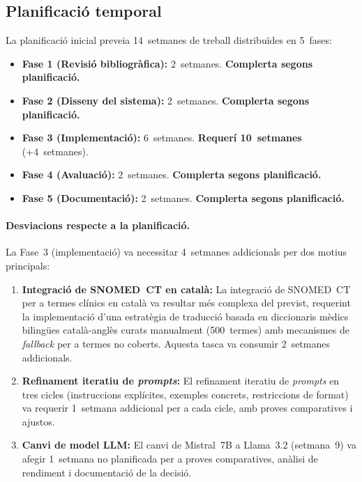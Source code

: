 \documentclass[CAT]{TFUOC}%
\begin{document}
\subsection{Planificació temporal}

La planificació inicial preveia 14~setmanes de treball distribuïdes en 5~fases:

\begin{itemize}
    \item \textbf{Fase 1 (Revisió bibliogràfica):} 2~setmanes. \textbf{Complerta segons planificació.}
    \item \textbf{Fase 2 (Disseny del sistema):} 2~setmanes. \textbf{Complerta segons planificació.}
    \item \textbf{Fase 3 (Implementació):} 6~setmanes. \textbf{Requerí 10~setmanes} (+4~setmanes).
    \item \textbf{Fase 4 (Avaluació):} 2~setmanes. \textbf{Complerta segons planificació.}
    \item \textbf{Fase 5 (Documentació):} 2~setmanes. \textbf{Complerta segons planificació.}
\end{itemize}

\paragraph{Desviacions respecte a la planificació.}
La Fase~3 (implementació) va necessitar 4~setmanes addicionals per dos motius principals:

\begin{enumerate}
    \item \textbf{Integració de SNOMED~CT en català:} La integració de SNOMED~CT per a termes clínics en català va resultar més complexa del previst, requerint la implementació d'una estratègia de traducció basada en diccionaris mèdics bilingües català-anglès curats manualment (500~termes) amb mecanismes de \textit{fallback} per a termes no coberts. Aquesta tasca va consumir 2~setmanes addicionals.
    
    \item \textbf{Refinament iteratiu de \textit{prompts}:} El refinament iteratiu de \textit{prompts} en tres cicles (instruccions explícites, exemples concrets, restriccions de format) va requerir 1~setmana addicional per a cada cicle, amb proves comparatives i ajustos.
    
    \item \textbf{Canvi de model LLM:} El canvi de Mistral~7B a Llama~3.2 (setmana~9) va afegir 1~setmana no planificada per a proves comparatives, anàlisi de rendiment i documentació de la decisió.
\end{enumerate}
\end{document}
